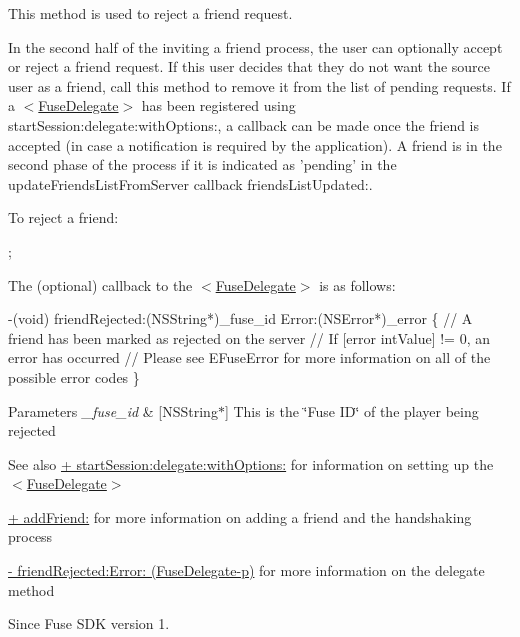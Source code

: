 This method is used to reject a friend request. 

In the second half of the inviting a friend process, the user can optionally accept or reject a friend request. If this user decides that they do not want the source user as a friend, call this method to remove it from the list of pending requests. If a $<$\hyperlink{protocol_fuse_delegate-p}{Fuse\+Delegate}$>$ has been registered using start\+Session\+:delegate\+:with\+Options\+:, a callback can be made once the friend is accepted (in case a notification is required by the application). A friend is in the second phase of the process if it is indicated as 'pending' in the update\+Friends\+List\+From\+Server callback friends\+List\+Updated\+:.

To reject a friend\+:


\begin{DoxyCode}
;
\end{DoxyCode}


The (optional) callback to the $<$\hyperlink{protocol_fuse_delegate-p}{Fuse\+Delegate}$>$ is as follows\+:


\begin{DoxyCode}
-(void) friendRejected:(NSString*)\_fuse\_id Error:(NSError*)\_error
\{
   \textcolor{comment}{// A friend has been marked as rejected on the server}
   \textcolor{comment}{// If [error intValue] != 0, an error has occurred}
   \textcolor{comment}{// Please see EFuseError for more information on all of the possible error codes}
\}
\end{DoxyCode}



\begin{DoxyParams}{Parameters}
{\em \+\_\+fuse\+\_\+id} & \mbox{[}N\+S\+String$\ast$\mbox{]} This is the \char`\"{}\+Fuse I\+D\char`\"{} of the player being rejected \\
\hline
\end{DoxyParams}
\begin{DoxySeeAlso}{See also}
\hyperlink{interface_fuse_s_d_k_adf7ed64a02b9540c9ded4b931ea4e400}{+ start\+Session\+:delegate\+:with\+Options\+:} for information on setting up the $<$\hyperlink{protocol_fuse_delegate-p}{Fuse\+Delegate}$>$ 

\hyperlink{interface_fuse_s_d_k_a92b5888d1e5dafe2ab2a76fda44be4d8}{+ add\+Friend\+:} for more information on adding a friend and the handshaking process 

\hyperlink{protocol_fuse_delegate-p_a2bc3be54c0a0a4f3cee3e9e96501c5ce}{-\/ friend\+Rejected\+:\+Error\+: (\+Fuse\+Delegate-\/p)} for more information on the delegate method 
\end{DoxySeeAlso}
\begin{DoxySince}{Since}
Fuse S\+D\+K version 1. 
\end{DoxySince}
\hypertarget{interface_fuse_s_d_k_aebd93d2d4e8a6d3029134a3656b003d5}{}

